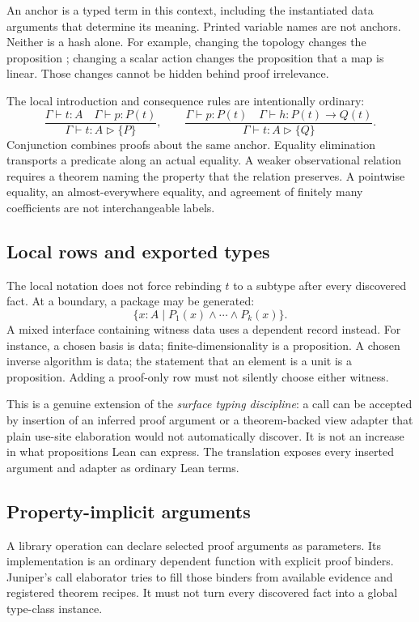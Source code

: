 \documentclass[11pt,a4paper]{article}
\newcommand{\code}[1]{\texttt{\small\detokenize{#1}}}
\newcommand{\view}{\mathrel{\triangleright}}\newcommand{\supp}{\operatorname{supp}}
\theoremstyle{definition}\newtheorem{definition}[theorem]{Definition}
\theoremstyle{remark}\newtheorem{remark}[theorem]{Remark}
\begin{document}
An anchor is a typed term in this context, including the instantiated data arguments that determine its meaning. Printed variable names are not anchors. Neither is a hash alone. For example, changing the topology changes the proposition \code{Continuous f}; changing a scalar action changes the proposition that a map is linear. Those changes cannot be hidden behind proof irrelevance.

The local introduction and consequence rules are intentionally ordinary:
\[
\frac{\Gamma\vdash t:A\quad\Gamma\vdash p:P(t)}
     {\Gamma\vdash t:A\view\{P\}},
\qquad
\frac{\Gamma\vdash p:P(t)\quad\Gamma\vdash h:P(t)\to Q(t)}
     {\Gamma\vdash t:A\view\{Q\}}.
\]
Conjunction combines proofs about the same anchor. Equality elimination transports a predicate along an actual equality. A weaker observational relation requires a theorem naming the property that the relation preserves. A pointwise equality, an almost-everywhere equality, and agreement of finitely many coefficients are not interchangeable labels.

\subsection{Local rows and exported types}
The local notation does not force rebinding $t$ to a subtype after every discovered fact. At a boundary, a package may be generated:
\[
 \{x:A\mid P_1(x)\land\cdots\land P_k(x)\}.
\]
A mixed interface containing witness data uses a dependent record instead. For instance, a chosen basis is data; finite-dimensionality is a proposition. A chosen inverse algorithm is data; the statement that an element is a unit is a proposition. Adding a proof-only row must not silently choose either witness.

This is a genuine extension of the \emph{surface typing discipline}: a call can be accepted by insertion of an inferred proof argument or a theorem-backed view adapter that plain use-site elaboration would not automatically discover. It is not an increase in what propositions Lean can express. The translation exposes every inserted argument and adapter as ordinary Lean terms.

\subsection{Property-implicit arguments}
A library operation can declare selected proof arguments as \code{requires} parameters. Its implementation is an ordinary dependent function with explicit proof binders. Juniper's call elaborator tries to fill those binders from available evidence and registered theorem recipes. It must not turn every discovered fact into a global type-class instance.
\end{document}
